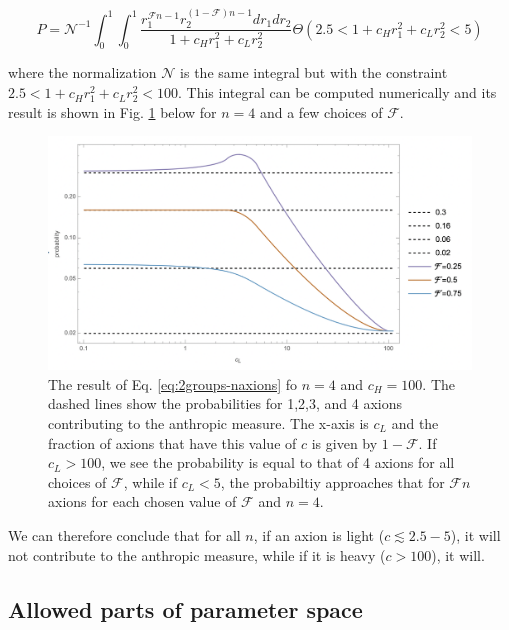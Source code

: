\documentclass[11pt]{article}
\begin{document}
\begin{equation}
    \label{eq:2groups-naxions}
    P = \mathcal{N}^{-1}\int_{0}^1\int_{0}^1 \frac{r_1^{\mathcal{F}n-1} r_2^{(1-\mathcal{F})n-1} dr_1 dr_2}{1+c_{H}r_1^2+c_{L}r_2^2}
    \Theta(2.5<1+c_{H}r_1^2+c_{L}r_2^2<5)
\end{equation}

\noindent where the normalization $\mathcal{N}$ is the same integral but with the constraint $2.5<1+c_{H}r_1^2+c_{L}r_2^2<100$. This integral can be computed numerically and its result is shown in Fig. \ref{fig:n-axions-2groups.png} below for $n=4$ and a few choices of $\mathcal{F}$.

\begin{figure}[h]
    \includegraphics[scale=0.55]{figs/n-axions-2groups2.png}
    \centering
    \caption{The result of Eq. \eqref{eq:2groups-naxions} fo $n=4$ and $c_H=100$. The dashed lines show the probabilities for 1,2,3, and 4 axions contributing to the anthropic measure. The x-axis is $c_L$ and the fraction of axions that have this value of $c$ is given by $1-\mathcal{F}$. If $c_L>100$, we see the probability is equal to that of 4 axions for all choices of $\mathcal{F}$, while if $c_L<5$, the probabiltiy approaches that for $\mathcal{F}n$ axions for each chosen value of $\mathcal{F}$ and $n=4$.}
    \label{fig:n-axions-2groups.png}
\end{figure}

We can therefore conclude that for all $n$, if an axion is light ($c\lesssim2.5-5$), it will not contribute to the anthropic measure, while if it is heavy ($c>100$), it will.

\subsection{Allowed parts of parameter space}
\end{document}
